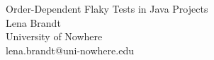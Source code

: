 

\begin{center}
{\Large Order-Dependent Flaky Tests in Java Projects}\\[1ex]
Lena Brandt\\
University of Nowhere\\
lena.brandt@uni-nowhere.edu
\end{center}

\visibleintro

